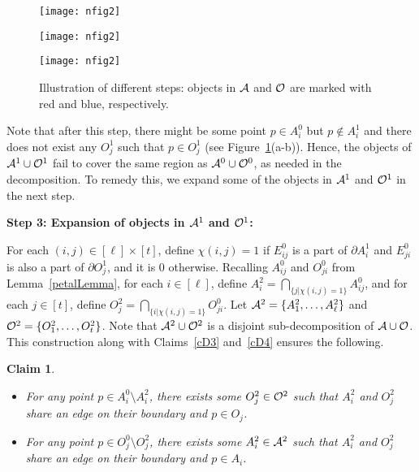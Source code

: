 \documentclass[a4paper,11pt]{article}
\newtheorem{claim}{Claim}
\begin{document}
\begin{figure}
    \centering
    \begin{minipage}{.3\linewidth}
        \centering
       \texttt{[image: nfig2]}
         \end{minipage}\begin{minipage}{0.3\linewidth}
        \centering
            \texttt{[image: nfig2]}
    \end{minipage}
      \begin{minipage}{0.3\linewidth}
        \centering
                   \texttt{[image: nfig2]}     
                              \end{minipage}
     \caption{Illustration of different steps: objects in $\cal A$ and $\cal O$ are marked with red and blue, respectively. }
      \label{fig_empty}
\end{figure}

Note that after this step, there might be some point $p\in {{A}^0_i}$ but $p\notin {{A}^1_i}$ and there does not exist any ${{O}^1_j}$ such that  $p \in {{O}^1_j}$  (see Figure~\ref{fig_empty}(a-b)). 
Hence, the objects of ${\cal A}^1 \cup {\cal O}^1$ fail to cover the same region as ${\cal A}^0 \cup {\cal O}^0$, as needed in the decomposition. 
To remedy this, we expand some of the objects in ${\cal A}^1$ and ${\cal O}^1$ in the next step.

{\bf Step 3: Expansion of objects in ${\cal A}^1$ and  ${\cal O}^1$:}

For each $(i, j) \in [\ell]\times [t]$, define $\chi(i, j) = 1$ if $E^0_{ij}$ is a part of $\partial A^1_i$ and $ E^0_{ji}$ is also a part of $\partial O^1_j$, and it is $0$ otherwise.  
Recalling $A^0_{ij}$ and $O^0_{ji}$ from Lemma~\ref{petalLemma}, for each $i\in[\ell]$, define $A^2_i=\bigcap\limits_{\{j| \chi(i, j) = 1\} } A^0_{ij} $, and for each $j\in [t]$,  define  $O^2_j=\bigcap\limits_{\{i| \chi(i, j) = 1\} }
O^0_{ji} $. 
Let  ${\cal A}^2=\{A^2_{1}, \ldots, 
A^2_{\ell}\}$ and  ${\cal O}^2=\{{O^2_{1}}, \ldots, 
{O^2_{t}}\}$. Note that ${\cal A}^2 \cup {\cal O}^2$ is a disjoint 
sub-decomposition of  ${\cal A}\cup {\cal O}$.
This construction 
along with Claims~\ref{cD3} and~\ref{cD4}  ensures the following.

\begin{claim}\label{cD9}
  \begin{itemize}
   \item For any point $p\in A^0_i\setminus A^2_i$, 
   there exists some ${O^2_j} \in {\cal O}^2$ such that  ${A^2_i}$ and ${O^2_j} $ share an edge on their boundary and $ p\in  O_j$.

\item For any point $p\in O^0_j\setminus O^2_j$, there exists  some ${A^2_i} \in {\cal A}^2$ such that  ${A^2_i}$ and  ${O^2 _j}$ share an edge on their boundary and $ p\in  A_i$.
\end{itemize}
\end{claim}
\end{document}
